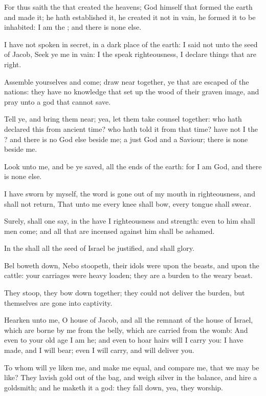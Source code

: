 \Verse For thus saith the \LORD that created the heavens; God himself that formed the earth and made it; he hath established it, he created it not in vain, he formed it to be inhabited: I am the \LORD; and there is none else.

\Verse I have not spoken in secret, in a dark place of the earth: I said not unto the seed of Jacob, Seek ye me in vain: I the \LORD speak righteousness, I declare things that are right.

\Verse Assemble yourselves and come; draw near together, ye that are escaped of the nations: they have no knowledge that set up the wood of their graven image, and pray unto a god that cannot save.

\Verse Tell ye, and bring them near; yea, let them take counsel together: who hath declared this from ancient time? who hath told it from that time?  have not I the \LORD? and there is no God else beside me; a just God and a Saviour; there is none beside me.

\Verse Look unto me, and be ye saved, all the ends of the earth: for I am God, and there is none else.

\Verse I have sworn by myself, the word is gone out of my mouth in righteousness, and shall not return, That unto me every knee shall bow, every tongue shall swear.

\Verse Surely, shall one say, in the \LORD have I righteousness and strength: even to him shall men come; and all that are incensed against him shall be ashamed.

\Verse In the \LORD shall all the seed of Israel be justified, and shall glory.


\Chapter
\Verse Bel boweth down, Nebo stoopeth, their idols were upon the beasts, and upon the cattle: your carriages were heavy loaden; they are a burden to the weary beast.

\Verse They stoop, they bow down together; they could not deliver the burden, but themselves are gone into captivity.

\Verse Hearken unto me, O house of Jacob, and all the remnant of the house of Israel, which are borne by me from the belly, which are carried from the womb: \Verse And even to your old age I am he; and even to hoar hairs will I carry you: I have made, and I will bear; even I will carry, and will deliver you.

\Verse To whom will ye liken me, and make me equal, and compare me, that we may be like?  \Verse They lavish gold out of the bag, and weigh silver in the balance, and hire a goldsmith; and he maketh it a god: they fall down, yea, they worship.


